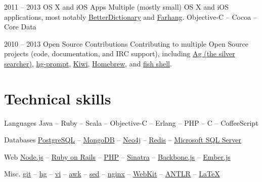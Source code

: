 \documentclass{tccv}
\begin{document}
\begin{project_list}
	 
\item{2011 -- 2013}
	 {}
	 {OS X and iOS Apps}
	 {Multiple (mostly small) OS X and iOS applications, most notably \href{http://pooriaazimi.github.io/BetterDictionary/}{BetterDictionary} and \href{http://www.turnedondigital.com/?portfolio=farhang-iphone-app}{Farhang}.}
	 {
	 	Objective-C -- 
		Cocoa -- 
		Core Data
	 }
	 


\item{2010 -- 2013}
	 {}
	 {Open Source Contributions}
	 {Contributing to multiple Open Source projects (code, documentation, and IRC support), including 
	 \href{https://github.com/ggreer/the_silver_searcher}{Ag (the silver searcher)}, 
	 \href{http://bitbucket.org/sjl/hg-prompt/}{hg-prompt}, \href{https://github.com/allending/Kiwi}{Kiwi}, 
	 \href{https://github.com/mxcl/homebrew}{Homebrew}, and 
	 \href{http://fishshell.com}{fish shell}.}
	 {}

\end{project_list}




\section{Technical skills}

\begin{factlist}

\item{Languages}
     {
     Java -- 
     Ruby -- 
     Scala -- 
     Objective-C -- 
     Erlang -- PHP -- 
     C -- 
     CoffeeScript
     }

\item{Databases}
     {
     \href{http://www.postgresql.org}{PostgreSQL} -- 
     \href{http://www.mongodb.org}{MongoDB} -- 
     \href{http://www.neo4j.org}{Neo4j} -- 
     \href{http://redis.io}{Redis} -- 
     \href{http://www.microsoft.com/en-us/sqlserver/default.aspx}{Microsoft SQL Server}
     }

\item{Web}
     {
     \href{http://nodejs.org}{Node.js} -- 
     \href{http://rubyonrails.org}{Ruby on Rails} -- 
     \href{http://php.net}{PHP} -- 
     \href{http://www.sinatrarb.com}{Sinatra} -- 
     \href{http://backbonejs.org}{Backbone.js} -- 
     \href{http://emberjs.com}{Ember.js}
     }

\item{Misc.}
     {
     \href{http://git-scm.com}{git} -- 
     \href{http://www.selenic.com/mercurial/}{hg} -- 
     \href{http://www.vim.org}{vi} -- 
     \href{http://awk.info}{awk} -- 
     \href{http://www.gnu.org/software/sed/}{sed} -- 
     \href{http://nginx.org/en/}{nginx} -- 
     \href{http://www.webkit.org}{WebKit} -- 
     \href{http://www.antlr.org}{ANTLR} -- 
     \href{http://www.latex-project.org}{\LaTeX}
     }

\end{factlist}
\end{document}
